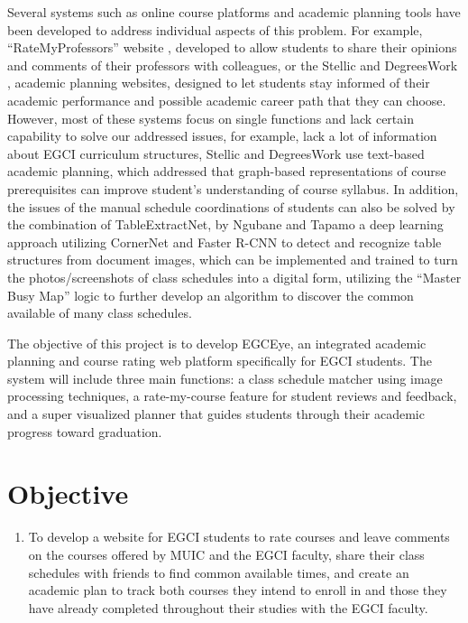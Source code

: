 \newpage
\hspace{1.6cm} Several systems such as online course platforms and academic planning tools have been developed to address individual aspects of this problem. For example, “RateMyProfessors” website \cite{ratemyprofessors}, developed to allow students to share their opinions and comments of their professors with colleagues, or the Stellic and DegreesWork \cite{stellic} \cite{degreeworks}, academic planning websites, designed to let students stay informed of their academic performance and possible academic career path that they can choose.  However, most of these systems focus on single functions and lack certain capability to solve our addressed issues, for example, \cite{ratemyprofessors} lack a lot of information about EGCI curriculum structures, Stellic and DegreesWork \cite{stellic} \cite{degreeworks} use text-based academic planning, which \cite{trippel2025developing} addressed that graph-based representations of course prerequisites can improve student’s understanding of course syllabus. In addition, the issues of the manual schedule coordinations of students can also be solved by the combination of TableExtractNet, by Ngubane and Tapamo \cite{ngubane2024tableextractnet} a deep learning approach utilizing CornerNet and Faster R-CNN to detect and recognize table structures from document images, which can be implemented and trained to turn the photos/screenshots of class schedules into a digital form, utilizing the “Master Busy Map” logic \cite{paper_9} to further develop an algorithm to discover the common available of many class schedules.


\hspace{1.6cm} The objective of this project is to develop EGCEye, an integrated academic planning and course rating web platform specifically for EGCI students. The system will include three main functions: a class schedule matcher using image processing techniques, a rate-my-course feature for student reviews and  feedback, and a super visualized planner that guides students through their academic progress toward graduation.


\section{Objective}
\begin{enumerate}
	\item To develop a website for EGCI students to rate courses and leave comments on the courses offered by MUIC and the EGCI faculty, share their class schedules with friends to find common available times, and create an academic plan to track both courses they intend to enroll in and those they have already completed throughout their studies with the EGCI faculty.
\end{enumerate}

